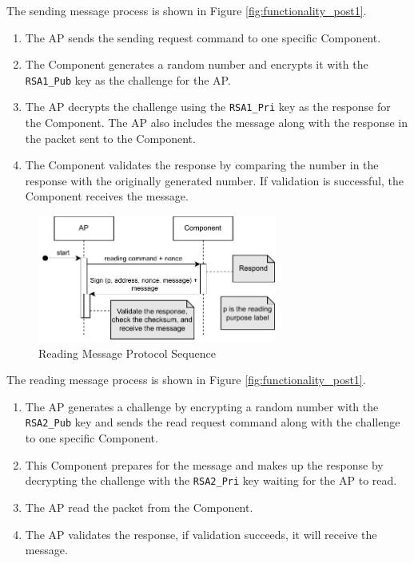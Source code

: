 \documentclass[11pt,oneside,onecolumn,letterpaper]{article}
\begin{document}
	The sending message process is shown in Figure \ref{fig:functionality_post1}.
	\begin{enumerate}
		\item The AP sends the sending request command to one specific Component.
		\item The Component generates a random number and encrypts it with the \texttt{RSA1\_Pub} key as the challenge for the AP.
		\item The AP decrypts the challenge using the \texttt{RSA1\_Pri} key as the response for the Component.
		The AP also includes the message along with the response in the packet sent to the Component.
		\item The Component validates the response by comparing the number in the response with the originally generated number.
		If validation is successful,
		the Component receives the message.
	\end{enumerate}
	
	\begin{figure}[h]
		\centering
		\includegraphics[width=0.7\textwidth]{pics/post2.pdf}
		\caption{Reading Message Protocol Sequence}
		\label{fig:functionality_post2}
	\end{figure}
	
	The reading message process is shown in Figure \ref{fig:functionality_post1}.
	\begin{enumerate}
		\item The AP generates a challenge by encrypting a random number with the \texttt{RSA2\_Pub} key and sends the read request command along with the challenge to one specific Component.
		\item This Component prepares for the message and makes up the response by decrypting the challenge with the \texttt{RSA2\_Pri} key
		waiting for the AP to read.
		\item The AP read the packet from the Component.
		\item The AP validates the response,
		if validation succeeds,
		it will receive the message.
	\end{enumerate}
	
\end{document}
